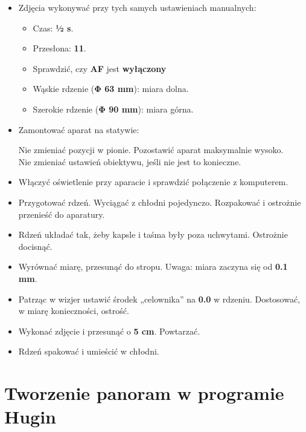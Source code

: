 \documentclass[
  letterpaper,
  DIV=11,
  numbers=noendperiod]{scrreprt}
\begin{document}
\begin{itemize}
\item
  Zdjęcia wykonywać przy tych samych ustawieniach manualnych:

  \begin{itemize}
  \item
    Czas: \textbf{½ s}.
  \item
    Przesłona: \textbf{11}.
  \item
    Sprawdzić, czy \textbf{AF} jest \textbf{wyłączony}
  \item
    Wąskie rdzenie (\textbf{Φ 63 mm}): miara dolna.
  \item
    Szerokie rdzenie (\textbf{Φ 90 mm}): miara górna.
  \end{itemize}
\item
  Zamontować aparat na statywie:

  Nie zmieniać pozycji w pionie. Pozostawić aparat maksymalnie wysoko.\\
  Nie zmieniać ustawień obiektywu, jeśli nie jest to konieczne.
\item
  Włączyć oświetlenie przy aparacie i sprawdzić połączenie z komputerem.
\item
  Przygotować rdzeń. Wyciągać z chłodni pojedynczo. Rozpakować i
  ostrożnie przenieść do aparatury.
\item
  Rdzeń układać tak, żeby kapsle i taśma były poza uchwytami. Ostrożnie
  docisnąć.
\item
  Wyrównać miarę, przesunąć do stropu. Uwaga: miara zaczyna się od
  \textbf{0.1 mm}.
\item
  Patrząc w wizjer ustawić środek „celownika'' na \textbf{0.0} w
  rdzeniu. Dostosować, w miarę konieczności, ostrość.
\item
  Wykonać zdjęcie i przesunąć o \textbf{5 cm}. Powtarzać.
\item
  Rdzeń spakować i umieścić w chłodni.
\end{itemize}

\hypertarget{tworzenie-panoram-w-programie-hugin}{%
\section{Tworzenie panoram w programie
Hugin}\label{tworzenie-panoram-w-programie-hugin}}
\end{document}
